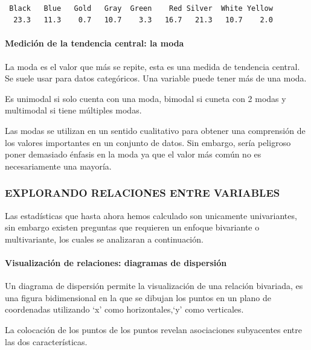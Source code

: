 \documentclass[
  letterpaper,
  DIV=11,
  numbers=noendperiod]{scrartcl}
\let\oldparagraph\paragraph
\renewcommand{\paragraph}[1]{\oldparagraph{#1}\mbox{}}
\begin{document}
\begin{verbatim}

 Black   Blue   Gold   Gray  Green    Red Silver  White Yellow 
  23.3   11.3    0.7   10.7    3.3   16.7   21.3   10.7    2.0 
\end{verbatim}

\hypertarget{mediciuxf3n-de-la-tendencia-central-la-moda}{%
\paragraph{Medición de la tendencia central: la
moda}\label{mediciuxf3n-de-la-tendencia-central-la-moda}}

La moda es el valor que más se repite, esta es una medida de tendencia
central. Se suele usar para datos categóricos. Una variable puede tener
más de una moda.

Es unimodal si solo cuenta con una moda, bimodal si cuneta con 2 modas y
multimodal si tiene múltiples modas.

Las modas se utilizan en un sentido cualitativo para obtener una
comprensión de los valores importantes en un conjunto de datos. Sin
embargo, sería peligroso poner demasiado énfasis en la moda ya que el
valor más común no es necesariamente una mayoría.

\hypertarget{explorando-relaciones-entre-variables}{%
\subsubsection{EXPLORANDO RELACIONES ENTRE
VARIABLES}\label{explorando-relaciones-entre-variables}}

Las estadísticas que hasta ahora hemos calculado son unicamente
univariantes, sin embargo existen preguntas que requieren un enfoque
bivariante o multivariante, los cuales se analizaran a continuación.

\hypertarget{visualizaciuxf3n-de-relaciones-diagramas-de-dispersiuxf3n}{%
\paragraph{Visualización de relaciones: diagramas de
dispersión}\label{visualizaciuxf3n-de-relaciones-diagramas-de-dispersiuxf3n}}

Un diagrama de dispersión permite la visualización de una relación
bivariada, es una figura bidimensional en la que se dibujan los puntos
en un plano de coordenadas utilizando `x' como horizontales,`y' como
verticales.

La colocación de los puntos de los puntos revelan asociaciones
subyacentes entre las dos características.
\end{document}
